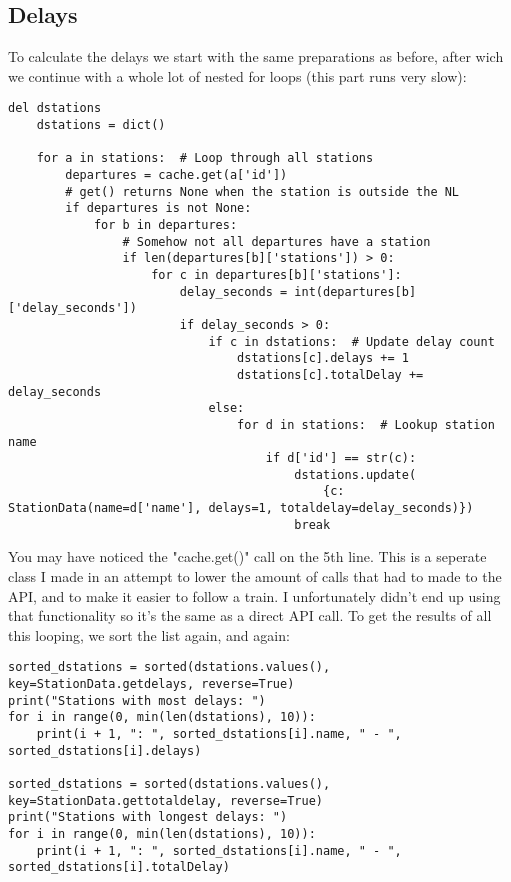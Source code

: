\documentclass[a4paper, 12pt, one column]{article}
\begin{document}
\subsection{Delays}
To calculate the delays we start with the same preparations as before, after wich we continue with a whole lot of nested for loops (this part runs very slow):
\begin{lstlisting}
del dstations
	dstations = dict()

	for a in stations:  # Loop through all stations
		departures = cache.get(a['id'])
		# get() returns None when the station is outside the NL
		if departures is not None:
			for b in departures:
			    # Somehow not all departures have a station
				if len(departures[b]['stations']) > 0:
					for c in departures[b]['stations']:
						delay_seconds = int(departures[b]['delay_seconds'])
						if delay_seconds > 0:
							if c in dstations:  # Update delay count
								dstations[c].delays += 1
								dstations[c].totalDelay += delay_seconds
							else:
								for d in stations:  # Lookup station name
									if d['id'] == str(c):
										dstations.update(
											{c: StationData(name=d['name'], delays=1, totaldelay=delay_seconds)})
										break
\end{lstlisting}
You may have noticed the "cache.get()" call on the 5th line. This is a seperate class I made in an attempt to lower the amount of calls that had to made to the API, and to make it easier to follow a train. I unfortunately didn't end up using that functionality so it's the same as a direct API call. 
To get the results of all this looping, we sort the list again, and again:
\begin{lstlisting}
sorted_dstations = sorted(dstations.values(), key=StationData.getdelays, reverse=True)
print("Stations with most delays: ")
for i in range(0, min(len(dstations), 10)):
	print(i + 1, ": ", sorted_dstations[i].name, " - ", sorted_dstations[i].delays)

sorted_dstations = sorted(dstations.values(), key=StationData.gettotaldelay, reverse=True)
print("Stations with longest delays: ")
for i in range(0, min(len(dstations), 10)):
	print(i + 1, ": ", sorted_dstations[i].name, " - ", sorted_dstations[i].totalDelay)
\end{lstlisting}
\newpage
\end{document}
